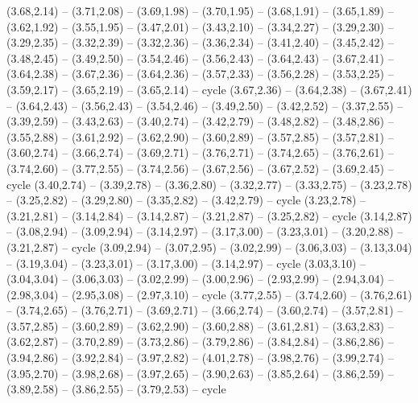 \expandafter\def\csname geo:gebiet:PER\endcsname{
  (3.68,2.14) -- (3.71,2.08) -- (3.69,1.98) -- (3.70,1.95) -- (3.68,1.91) -- (3.65,1.89) -- (3.62,1.92) -- (3.55,1.95) -- (3.47,2.01) -- (3.43,2.10) -- (3.34,2.27) -- (3.29,2.30) -- (3.29,2.35) -- (3.32,2.39) -- (3.32,2.36) -- (3.36,2.34) -- (3.41,2.40) -- (3.45,2.42) -- (3.48,2.45) -- (3.49,2.50) -- (3.54,2.46) -- (3.56,2.43) -- (3.64,2.43) -- (3.67,2.41) -- (3.64,2.38) -- (3.67,2.36) -- (3.64,2.36) -- (3.57,2.33) -- (3.56,2.28) -- (3.53,2.25) -- (3.59,2.17) -- (3.65,2.19) -- (3.65,2.14) -- cycle}
\expandafter\def\csname geo:gebiet:COL\endcsname{
  (3.67,2.36) -- (3.64,2.38) -- (3.67,2.41) -- (3.64,2.43) -- (3.56,2.43) -- (3.54,2.46) -- (3.49,2.50) -- (3.42,2.52) -- (3.37,2.55) -- (3.39,2.59) -- (3.43,2.63) -- (3.40,2.74) -- (3.42,2.79) -- (3.48,2.82) -- (3.48,2.86) -- (3.55,2.88) -- (3.61,2.92) -- (3.62,2.90) -- (3.60,2.89) -- (3.57,2.85) -- (3.57,2.81) -- (3.60,2.74) -- (3.66,2.74) -- (3.69,2.71) -- (3.76,2.71) -- (3.74,2.65) -- (3.76,2.61) -- (3.74,2.60) -- (3.77,2.55) -- (3.74,2.56) -- (3.67,2.56) -- (3.67,2.52) -- (3.69,2.45) -- cycle}
\expandafter\def\csname geo:gebiet:PAN\endcsname{
  (3.40,2.74) -- (3.39,2.78) -- (3.36,2.80) -- (3.32,2.77) -- (3.33,2.75) -- (3.23,2.78) -- (3.25,2.82) -- (3.29,2.80) -- (3.35,2.82) -- (3.42,2.79) -- cycle}
\expandafter\def\csname geo:gebiet:CRI\endcsname{
  (3.23,2.78) -- (3.21,2.81) -- (3.14,2.84) -- (3.14,2.87) -- (3.21,2.87) -- (3.25,2.82) -- cycle}
\expandafter\def\csname geo:gebiet:NIC\endcsname{
  (3.14,2.87) -- (3.08,2.94) -- (3.09,2.94) -- (3.14,2.97) -- (3.17,3.00) -- (3.23,3.01) -- (3.20,2.88) -- (3.21,2.87) -- cycle}
\expandafter\def\csname geo:gebiet:HND\endcsname{
  (3.09,2.94) -- (3.07,2.95) -- (3.02,2.99) -- (3.06,3.03) -- (3.13,3.04) -- (3.19,3.04) -- (3.23,3.01) -- (3.17,3.00) -- (3.14,2.97) -- cycle}
\expandafter\def\csname geo:gebiet:SLV\endcsname{
  }
\expandafter\def\csname geo:gebiet:GTM\endcsname{
  (3.03,3.10) -- (3.04,3.04) -- (3.06,3.03) -- (3.02,2.99) -- (3.00,2.96) -- (2.93,2.99) -- (2.94,3.04) -- (2.98,3.04) -- (2.95,3.08) -- (2.97,3.10) -- cycle}
\expandafter\def\csname geo:gebiet:BLZ\endcsname{
  }
\expandafter\def\csname geo:gebiet:VEN\endcsname{
  (3.77,2.55) -- (3.74,2.60) -- (3.76,2.61) -- (3.74,2.65) -- (3.76,2.71) -- (3.69,2.71) -- (3.66,2.74) -- (3.60,2.74) -- (3.57,2.81) -- (3.57,2.85) -- (3.60,2.89) -- (3.62,2.90) -- (3.60,2.88) -- (3.61,2.81) -- (3.63,2.83) -- (3.62,2.87) -- (3.70,2.89) -- (3.73,2.86) -- (3.79,2.86) -- (3.84,2.84) -- (3.86,2.86) -- (3.94,2.86) -- (3.92,2.84) -- (3.97,2.82) -- (4.01,2.78) -- (3.98,2.76) -- (3.99,2.74) -- (3.95,2.70) -- (3.98,2.68) -- (3.97,2.65) -- (3.90,2.63) -- (3.85,2.64) -- (3.86,2.59) -- (3.89,2.58) -- (3.86,2.55) -- (3.79,2.53) -- cycle}
